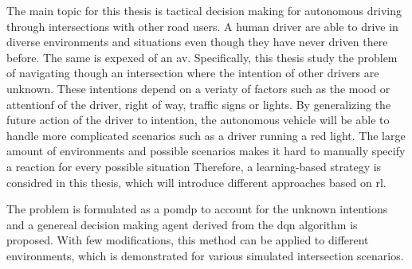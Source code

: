 The main topic for this thesis is tactical decision making for autonomous driving through intersections with other road users. A human driver are able to drive in diverse environments and situations even though they have never driven there before. The same is expexed of an \gls{av}. Specifically, this thesis study the problem of navigating though an intersection where the intention of other drivers are unknown. These intentions depend on a veriaty of factors such as the mood or attentionf of the driver, right of way, traffic signs or lights. By generalizing the future action of the driver to intention, the autonomous vehicle will be able to handle more complicated scenarios such as a driver running a red light. 
The large amount of environments and possible scenarios makes it hard to manually specify a reaction for every possible situation
Therefore, a learning-based strategy is considred in this thesis, which will introduce different approaches based on \gls{rl}. 

The problem is formulated as a \gls{pomdp} to account for the unknown intentions and a genereal decision making agent derived from the \gls{dqn} algorithm is proposed. With few modifications, this method can be applied to different environments, which is demonstrated for various simulated intersection scenarios. 






